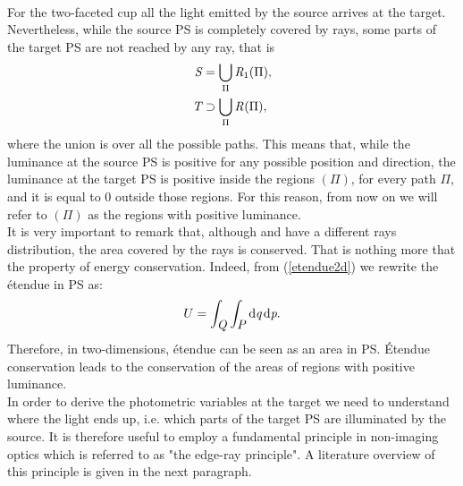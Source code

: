 \\ \indent For the two-faceted cup all the light emitted by the source arrives at the target. Nevertheless, while the source PS is completely covered by rays, some parts of the target PS are not reached by any ray, that is
\begin{equation}
\begin{aligned}
\mbox{$\emph{S}_{\textit{}}$} &= \bigcup_{\Pi} \mbox{$\emph{R}_{\textit{$1$}}$}(\Pi),\\
\mbox{$\emph{T}_{\textit{}}$} &\supset \bigcup_{\Pi} \mbox{$\emph{R}_{\textit{}}$}(\Pi),
\end{aligned}
\end{equation}
where the union is over all the possible paths.
This means that, while the luminance at the source PS is positive for any possible position and direction, the luminance at the target PS is positive inside the regions $(\Pi)$, for every path $\Pi$, and it is equal to $0$ outside those regions. For this reason, from now on we will refer to $(\Pi)$ as the regions with positive luminance.\\ \indent
It is very important to remark that, although  and  have a different rays distribution, the area covered by the rays is conserved. That is nothing more that the property of energy conservation. Indeed, from (\ref{etendue2d}) we rewrite the \'{e}tendue in PS as:
\begin{equation}
U = \int_{\mbox{$\emph{Q}_{\textit{}}$}}\int_{\mbox{$\emph{P}_{\textit{}}$}} \textrm{d}\textit{q}\,\textrm{d}\textit{p}.
\end{equation}
Therefore, in two-dimensions, \'{e}tendue can be seen as an area in PS.  \'{E}tendue conservation leads to the conservation of the areas of regions with positive luminance.\\ \indent
In order to derive the photometric variables at the target we need to understand where the light ends up, i.e. which parts of the target PS are illuminated by the source.
It is therefore useful to employ a fundamental principle in non-imaging optics which is referred to as "the edge-ray principle". A literature overview of this principle is given in the next paragraph.
